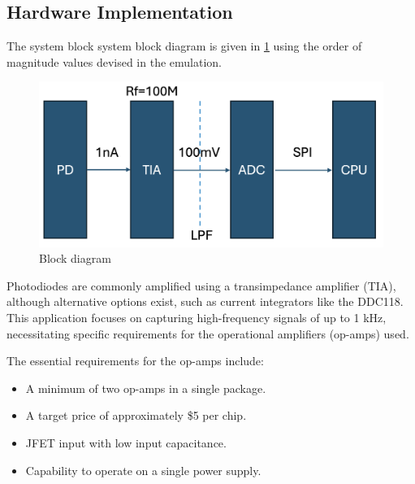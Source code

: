 

\subsection{Hardware Implementation}

The system block system block diagram is given in \ref{fig:block} using the order of magnitude values devised in the emulation.
\begin{figure}[t]
  \centering
  \includegraphics[width=\widthnarrow]{figures/impl/block_diagram.png}
  \caption{Block diagram}
  \label{fig:block}
\end{figure}

Photodiodes are commonly amplified using a transimpedance amplifier (TIA), although alternative options exist, such as current integrators like the DDC118. This application focuses on capturing high-frequency signals of up to 1 kHz, necessitating specific requirements for the operational amplifiers (op-amps) used.

The essential requirements for the op-amps include:
\begin{itemize}
  \item A minimum of two op-amps in a single package.
  \item A target price of approximately \$5 per chip.
  \item JFET input with low input capacitance.
  \item Capability to operate on a single power supply.
\end{itemize}

